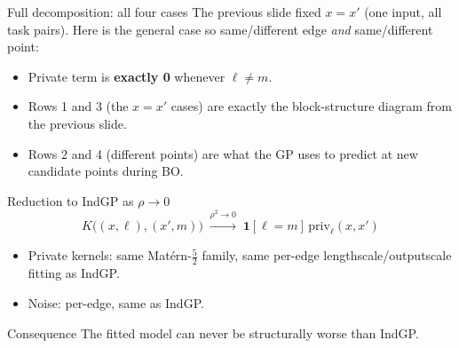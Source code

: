 \documentclass[11pt]{beamer}
\begin{document}
\begin{frame}{Full decomposition: all four cases}
The previous slide fixed $x=x'$ (one input, all task pairs). Here is the
general case so same/different edge \emph{and} same/different point:
\footnotesize
\begin{center}
\end{center}
\normalsize
\vspace{0.2cm}
\begin{itemize}
    \item Private term is \textbf{exactly 0} whenever $\ell \neq m$. 
    \item Rows 1 and 3 (the $x=x'$ cases) are exactly the block-structure
    diagram from the previous slide.
    \item Rows 2 and 4 (different points) are what the GP uses to predict
    at new candidate points during BO.
\end{itemize}
\end{frame}

\begin{frame}{Reduction to IndGP as $\rho \to 0$}
\[
    K\bigl((x,\ell),(x',m)\bigr) \;\xrightarrow{\rho^2 \to 0}\;
    \mathbf{1}[\ell=m]\,\mathrm{priv}_\ell(x,x')
\]
\begin{itemize}
    \item Private kernels: same Mat\'ern-$\tfrac52$ family, same
    per-edge lengthscale/outputscale fitting as IndGP.
    \item Noise: per-edge, same as IndGP.

\end{itemize}
\vspace{0.4cm}
\begin{block}{Consequence}
The fitted model can never
be structurally worse than IndGP.
\end{block}
\end{frame}
\end{document}
